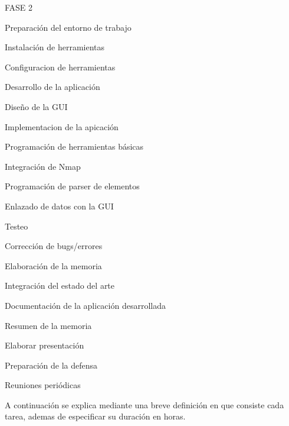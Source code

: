 \begin{numbered}
	\item FASE 2
	\begin{numbered}
		\item Preparación del entorno de trabajo
		\begin{numbered}
			\item Instalación de herramientas
			\item Configuracion de herramientas
		\end{numbered}
		
		\item Desarrollo de la aplicación
		\begin{numbered}
			\item Diseño de la GUI
			\item Implementacion de la apicación
			\begin{numbered}
				\item Programación de herramientas básicas
				\item Integración de Nmap
				\item Programación de parser de elementos
				\item Enlazado de datos con la GUI
			\end{numbered}
			\item Testeo
			\item Corrección de bugs/errores
		\end{numbered}
	\end{numbered}
	
	\item Elaboración de la memoria
	\begin{numbered}
		\item Integración del estado del arte
		\item Documentación de la aplicación desarrollada
		\item Resumen de la memoria
		\item Elaborar presentación
		\item Preparación de la defensa
	\end{numbered}
	
	\item Reuniones periódicas
\end{numbered}

A continuación se explica mediante una breve definición en que consiste cada tarea, ademas de especificar su duración en horas.

